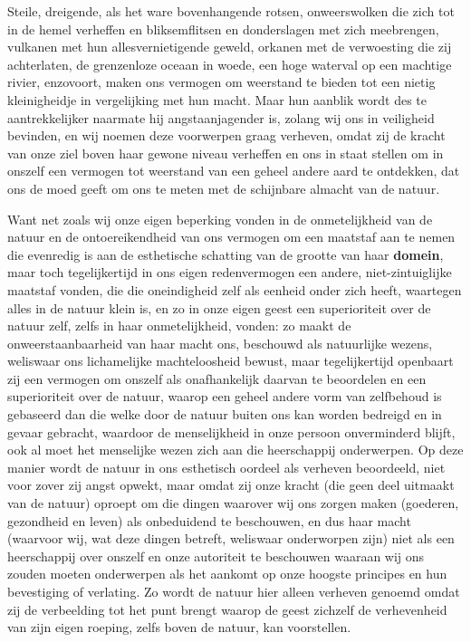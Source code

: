 Steile, dreigende, als het ware bovenhangende rotsen, onweerswolken die zich tot in de hemel verheffen en bliksemflitsen en donderslagen met zich meebrengen, vulkanen met hun allesvernietigende geweld, orkanen met de verwoesting die zij achterlaten, de grenzenloze oceaan in woede, een hoge waterval op een machtige rivier, enzovoort, maken ons vermogen om weerstand te bieden tot een nietig kleinigheidje in vergelijking met hun macht. Maar hun aanblik wordt des te aantrekkelijker naarmate hij angstaanjagender is, zolang wij ons in veiligheid bevinden, en wij noemen deze voorwerpen graag verheven, omdat zij de kracht van onze ziel boven haar gewone niveau verheffen en ons in staat stellen om in onszelf een vermogen tot weerstand van een geheel andere aard te ontdekken, dat ons de moed geeft om ons te meten met de schijnbare almacht van de natuur.

Want net zoals wij onze eigen beperking vonden in de onmetelijkheid van de natuur en de ontoereikendheid van ons vermogen om een maatstaf aan te nemen die evenredig is aan de esthetische schatting van de grootte van haar \textbf{domein}, maar toch tegelijkertijd in ons eigen redenvermogen een andere, niet-zintuiglijke maatstaf vonden, die die oneindigheid zelf als eenheid onder zich heeft, waartegen alles in de natuur klein is, en zo in onze eigen geest een superioriteit over de natuur zelf, zelfs in haar onmetelijkheid, vonden: zo maakt de onweerstaanbaarheid van haar macht ons, beschouwd als natuurlijke wezens, weliswaar ons lichamelijke machteloosheid bewust, maar tegelijkertijd openbaart zij een vermogen om onszelf als onafhankelijk daarvan te beoordelen en een superioriteit over de natuur, waarop een geheel andere vorm van zelfbehoud is gebaseerd dan die welke door de natuur buiten ons kan worden bedreigd en in gevaar gebracht, waardoor de menselijkheid in onze persoon onverminderd blijft, ook al moet het menselijke wezen zich aan die heerschappij onderwerpen. Op deze manier wordt de natuur in ons esthetisch oordeel als verheven beoordeeld, niet voor zover zij angst opwekt, maar omdat zij onze kracht (die geen deel uitmaakt van de natuur) oproept om die dingen waarover wij ons zorgen maken (goederen, gezondheid en leven) als onbeduidend te beschouwen, en dus haar macht (waarvoor wij, wat deze dingen betreft, weliswaar onderworpen zijn) niet als een heerschappij over onszelf en onze autoriteit te beschouwen waaraan wij ons zouden moeten onderwerpen als het aankomt op onze hoogste principes en hun bevestiging of verlating. Zo wordt de natuur hier alleen verheven genoemd omdat zij de verbeelding tot het punt brengt waarop de geest zichzelf de verhevenheid van zijn eigen roeping, zelfs boven de natuur, kan voorstellen.

